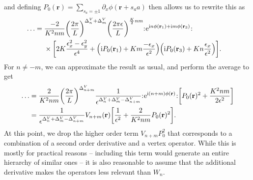 and defining $P_0(\textbf{r}) = \sum_{s_a=\pm 1} \partial_x\phi(\textbf{r}+s_aa)$ then allows us to rewrite this as
\begin{align*}
\dots &= \bsplit{&\frac{-2}{K^2nm} \kla*{\frac{2\pi}{L}}^{\Delta^V_n + \Delta^V_m} \kla*{\frac{2\pi\epsilon}{L}}^{\frac{K}{2}nm} \normord{\powe{\i n\phi(\textbf{r}_1) + \i m\phi(\textbf{r}_3)}} \\
&\times \klb[\bigg]{2K \frac{\epsilon_x^2-\epsilon_y^2}{\epsilon^4} + \kla[\Big]{\i P_0(\textbf{r}_1) + K m \frac{-\epsilon_x}{\epsilon^2}} \kla[\Big]{\i P_0(\textbf{r}_3) + K n \frac{\epsilon_x}{\epsilon^2}}}. }
\end{align*}
For $n\neq -m$, we can approximate the result as usual, and perform the average to get
\begin{align*}
\dots &= \frac{2}{K^2nm} \kla*{\frac{2\pi}{L}}^{\Delta^V_{n+m}} \frac{1}{\epsilon^{\Delta^V_{n} + \Delta^V_{m} - \Delta^V_{n+m}}} \normord{\powe{\i (n+m)\phi(\textbf{r})}} \klb*{P_0(\textbf{r})^2 + \frac{K^2nm}{2\epsilon^2}} \\
&= \frac{1}{\epsilon^{\Delta^V_{n} + \Delta^V_{m} - \Delta^V_{n+m}}} V_{n+m}(\textbf{r}) \klb*{\frac{1}{\epsilon^2} + \frac{2}{K^2nm} P_0(\textbf{r})^2}.
\end{align*}%
At this point, we drop the higher order term $V_{n+m}P_0^2$ that corresponds to a combination of a second order derivative and a vertex operator.
While this is mostly for practical reasons -- including this term would generate an entire hierarchy of similar ones -- it is also reasonable to assume that the additional derivative makes the operators less relevant than $W_n$.
